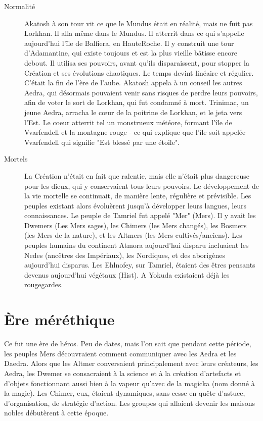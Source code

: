\begin{description}
\item[Normalité]
Akatosh à son tour vit ce que le Mundus était en réalité, mais ne fuit pas Lorkhan. Il alla même dans le Mundus. Il atterrit dans ce qui s'appelle aujourd'hui l'île de Balfiera, en HauteRoche. Il y construit une tour d'Adamantine, qui existe toujours et est la plus vieille bâtisse encore debout. Il utilisa ses pouvoirs, avant qu'ils disparaissent, pour stopper la Création et ses évolutions chaotiques. Le temps devint linéaire et régulier. C'était la fin de l'ère de l'aube. Akatosh appela à un conseil les autres Aedra, qui désormais pouvaient venir sans risques de perdre leurs pouvoirs, afin de voter le sort de Lorkhan, qui fut condamné à mort. Trinimac, un jeune Aedra, arracha le cœur de la poitrine de Lorkhan, et le jeta vers l'Est. Le coeur atterrit tel un monstrueux météore, formant l'île de Vvarfendell et la montagne rouge - ce qui explique que l'île soit appelée Vvarfendell qui signifie "Est blessé par une étoile".
\item[Mortels]
La Création n'était en fait que ralentie, mais elle n'était plus dangereuse pour les dieux, qui y conservaient tous leurs pouvoirs. Le développement de la vie mortelle se continuait, de manière lente, régulière et prévisible. Les peuples existant alors évoluèrent jusqu'à développer leurs langues, leurs connaissances. Le peuple de Tamriel fut appelé "Mer" (Mers). Il y avait les Dwemers (Les Mers sages), les Chimers (les Mers changés), les Bosmers (les Mers de la nature), et les Altmers (les Mers cultivés/anciens). Les peuples humains du continent Atmora aujourd'hui disparu incluaient les Nedes (ancêtres des Impériaux), les Nordiques, et des aborigènes aujourd'hui disparus. Les Ehlnofey, sur Tamriel, étaient des êtres pensants devenus aujourd'hui végétaux (Hist). A Yokuda existaient déjà les rougegardes.
\end{description}

\section{Ère méréthique}

Ce fut une ère de héros. Peu de dates, mais l'on sait que pendant cette période, les peuples Mers découvraient comment communiquer avec les Aedra et les Daedra. Alors que les Altmer conversaient principalement avec leurs créateurs, les Aedra, les Dwemer se consacraient à la science et à la création d'artefacts et d'objets fonctionnant aussi bien à la vapeur qu'avec de la magicka (nom donné à la magie). Les Chimer, eux, étaient dynamiques, sans cesse en quête d'astuce, d'organisation, de stratégie d'action. Les groupes qui allaient devenir les maisons nobles débutèrent à cette époque.

